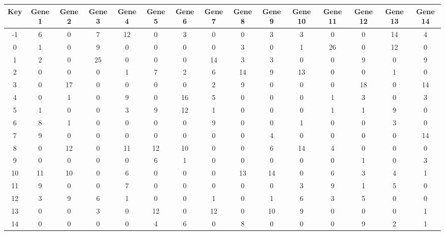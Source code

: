 \begin{tabular}{|c|c|c|c|c|c|c|c|c|c|c|c|c|c|c|}
\hline
Key & Gene 1 & Gene 2 & Gene 3 & Gene 4 & Gene 5 & Gene 6 & Gene 7 & Gene 8 & Gene 9 & Gene 10 & Gene 11 & Gene 12 & Gene 13 & Gene 14 \\
\hline
-1 & 6 & 0 & 7 & 12 & 0 & 3 & 0 & 0 & 3 & 3 & 0 & 0 & 14 & 4 \\
0 & 1 & 0 & 9 & 0 & 0 & 0 & 0 & 3 & 0 & 1 & 26 & 0 & 12 & 0 \\
1 & 2 & 0 & 25 & 0 & 0 & 0 & 14 & 3 & 3 & 0 & 0 & 9 & 0 & 9 \\
2 & 0 & 0 & 0 & 1 & 7 & 2 & 6 & 14 & 9 & 13 & 0 & 0 & 1 & 0 \\
3 & 0 & 17 & 0 & 0 & 0 & 0 & 2 & 9 & 0 & 0 & 0 & 18 & 0 & 14 \\
4 & 0 & 1 & 0 & 9 & 0 & 16 & 5 & 0 & 0 & 0 & 1 & 3 & 0 & 3 \\
5 & 1 & 0 & 0 & 3 & 9 & 12 & 1 & 0 & 0 & 0 & 1 & 1 & 9 & 0 \\
6 & 8 & 1 & 0 & 0 & 0 & 0 & 9 & 0 & 0 & 1 & 0 & 0 & 3 & 0 \\
7 & 9 & 0 & 0 & 0 & 0 & 0 & 0 & 0 & 4 & 0 & 0 & 0 & 0 & 14 \\
8 & 0 & 12 & 0 & 11 & 12 & 10 & 0 & 0 & 6 & 14 & 4 & 0 & 0 & 0 \\
9 & 0 & 0 & 0 & 0 & 6 & 1 & 0 & 0 & 0 & 0 & 0 & 1 & 0 & 3 \\
10 & 11 & 10 & 0 & 6 & 0 & 0 & 0 & 13 & 14 & 0 & 6 & 3 & 4 & 1 \\
11 & 9 & 0 & 0 & 7 & 0 & 0 & 0 & 0 & 0 & 3 & 9 & 1 & 5 & 0 \\
12 & 3 & 9 & 6 & 1 & 0 & 0 & 1 & 0 & 1 & 6 & 3 & 5 & 0 & 0 \\
13 & 0 & 0 & 3 & 0 & 12 & 0 & 12 & 0 & 10 & 9 & 0 & 0 & 0 & 1 \\
14 & 0 & 0 & 0 & 0 & 4 & 6 & 0 & 8 & 0 & 0 & 0 & 9 & 2 & 1 \\
\hline
\end{tabular}